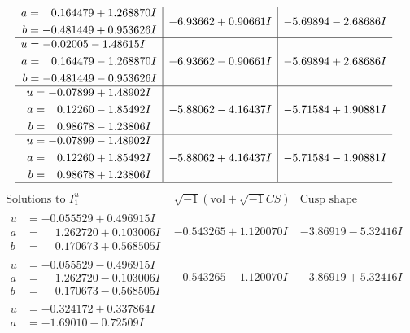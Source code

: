 \documentclass[1p]{elsarticle_modified}
\theoremstyle{definition}
\newcommand{\I}{\sqrt{-1}}
\begin{document}
$$\begin{array}{c|c|c}
\begin{aligned}
a &= \phantom{-}0.164479 + 1.268870 I \\
b &= -0.481449 + 0.953626 I\end{aligned}
 & -6.93662 + 0.90661 I & -5.69894 - 2.68686 I \\ \hline\begin{aligned}
u &= -0.02005 - 1.48615 I \\
a &= \phantom{-}0.164479 - 1.268870 I \\
b &= -0.481449 - 0.953626 I\end{aligned}
 & -6.93662 - 0.90661 I & -5.69894 + 2.68686 I \\ \hline\begin{aligned}
u &= -0.07899 + 1.48902 I \\
a &= \phantom{-}0.12260 - 1.85492 I \\
b &= \phantom{-}0.98678 - 1.23806 I\end{aligned}
 & -5.88062 - 4.16437 I & -5.71584 + 1.90881 I \\ \hline\begin{aligned}
u &= -0.07899 - 1.48902 I \\
a &= \phantom{-}0.12260 + 1.85492 I \\
b &= \phantom{-}0.98678 + 1.23806 I\end{aligned}
 & -5.88062 + 4.16437 I & -5.71584 - 1.90881 I\\
 \hline 
 \end{array}$$\newpage$$\begin{array}{c|c|c}  
\text{Solutions to }I^u_{1}& \I (\text{vol} + \sqrt{-1}CS) & \text{Cusp shape}\\
 \hline 
\begin{aligned}
u &= -0.055529 + 0.496915 I \\
a &= \phantom{-}1.262720 + 0.103006 I \\
b &= \phantom{-}0.170673 + 0.568505 I\end{aligned}
 & -0.543265 + 1.120070 I & -3.86919 - 5.32416 I \\ \hline\begin{aligned}
u &= -0.055529 - 0.496915 I \\
a &= \phantom{-}1.262720 - 0.103006 I \\
b &= \phantom{-}0.170673 - 0.568505 I\end{aligned}
 & -0.543265 - 1.120070 I & -3.86919 + 5.32416 I \\ \hline\begin{aligned}
u &= -0.324172 + 0.337864 I \\
a &= -1.69010 - 0.72509 I \\

\end{aligned}
\end{array}$$
\end{document}
